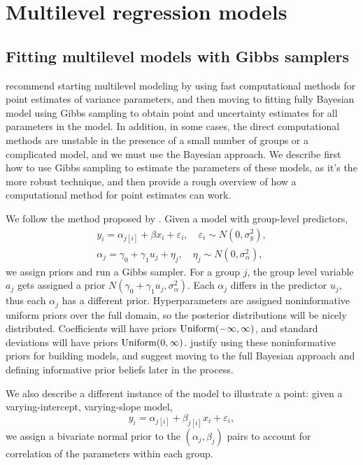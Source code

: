 \documentclass[12pt,twoside]{article}
\begin{document}
\section{Multilevel regression models}

\subsection{Fitting multilevel models with Gibbs samplers}
  
\cite{Gelman:2007aa} recommend starting multilevel modeling by using fast computational methods for point estimates of variance parameters, and then moving to fitting fully Bayesian model using Gibbs sampling to obtain point and uncertainty estimates for all parameters in the model. In addition, in some cases, the direct computational methods are unstable in the presence of a small number of groups or a complicated model, and we must use the Bayesian approach. We describe first how to use Gibbs sampling to estimate the parameters of these models, as it's the more robust technique, and then provide a rough overview of how a computational method for point estimates can work.  
 
 We follow the method proposed by \cite{Gelman:2007aa}. Given a model with group-level predictors, \begin{align*}
  y_i = \alpha_{j[i]} + \beta x_i + \varepsilon_i, \quad \varepsilon_i \sim N(0, \sigma^2_y), \\
  \alpha_j = \gamma_0 + \gamma_1 u_j + \eta_j, \quad \eta_j \sim N(0, \sigma^2_\alpha),
 \end{align*} we assign priors and run a Gibbs sampler. For a group \(j\), the group level variable \(a_j\) gets assigned a prior \(N(\gamma_0 + \gamma_1u_j, \sigma^2_\alpha)\). Each \(\alpha_j\) differs in the predictor \(u_j\), thus each \(\alpha_j\) has a different prior. Hyperparameters are assigned noninformative uniform priors over the full domain, so the posterior distributions will be nicely distributed. Coefficients will have priors \(\operatorname{Uniform}(-\infty, \infty)\), and standard deviations will have priors \(\operatorname{Uniform}(0, \infty)\). \cite{Gelman:2007aa} justify using these noninformative priors for building models, and suggest moving to the full Bayesian approach and defining informative prior beliefs later in the process.
 
 We also describe a different instance of the model to illustrate a point: given a varying-intercept, varying-slope model, \[
  y_i = \alpha_{j[i]} + \beta_{j[i]}x_i + \varepsilon_i,
 \] we assign a bivariate normal prior to the \((\alpha_j, \beta_j)\) pairs to account for correlation of the parameters within each group.
 
\end{document}
